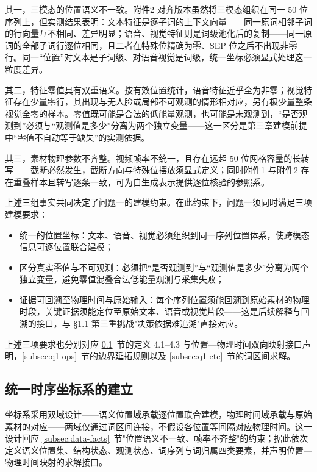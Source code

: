 \documentclass[colorprint,nocoverzero]{gmcmthesis}
\begin{document}
其一，三模态的位置语义不一致。附件2 对齐版本虽然将三模态组织在同一 50 位序列上，但实测结果表明：文本特征是逐子词的上下文向量——同一原词相邻子词的行向量互不相同、差异明显；语音、视觉特征则是词级池化后的复制——同一原词的全部子词行逐位相同，且二者在特殊位精确为零、SEP 位之后不出现非零行。同一``位置''对文本是子词级、对语音视觉是词级，统一坐标必须显式处理这一粒度差异。

其二，特征零值具有双重语义。按有效位置统计，语音特征近乎全为非零；视觉特征存在少量零行，其出现与无人脸或局部不可观测的情形相对应，另有极少量整条视觉全零的样本。零值既可能是合法的低能量观测，也可能是未观测到，``是否观测到''必须与``观测值是多少''分离为两个独立变量——这一区分是第三章建模前提中``零值不自动等于缺失''的实测依据。

其三，素材物理参数不齐整。视频帧率不统一，且存在远超 50 位网格容量的长转写——截断必然发生，截断方向与特殊位摆放须显式定义；同时附件1 与附件2 存在重叠样本且转写逐条一致，可为自生成表示提供逐位核验的参照系。

上述三组事实共同决定了问题一的建模约束。在此约束下，问题一须同时满足三项建模要求：

\begin{itemize}
  \item 统一的位置坐标：文本、语音、视觉必须组织到同一序列位置体系，使跨模态信息可逐位置联合建模；
  \item 区分真实零值与不可观测：必须把``是否观测到''与``观测值是多少''分离为两个独立变量，避免零值混叠合法低能量观测与采集失败；
  \item 证据可回溯至物理时间与原始输入：每个序列位置须能回溯到原始素材的物理时段，关键证据须能定位至原始文本、语音或视觉片段——这是后续解释与回溯的接口，与 §1.1 第三重挑战"决策依据难追溯"直接对应。
\end{itemize}

上述三项要求也分别对应 \ref{subsec:q1-coords}~节的定义 4.1--4.3 与位置—物理时间双向映射接口声明，\ref{subsec:q1-ops}~节的边界延拓规则以及 \ref{subsec:q1-ctc}~节的词区间求解。

\subsection{统一时序坐标系的建立}\label{subsec:q1-coords}
坐标系采用双域设计——语义位置域承载逐位置联合建模，物理时间域承载与原始素材的对应——两域仅通过词区间连接，不假设各位置等间隔对应物理时间。这一设计回应 \ref{subsec:data-facts}~节"位置语义不一致、帧率不齐整"的约束；据此依次定义语义位置集、结构状态、观测状态、词序列与词归属四类要素，并声明位置—物理时间映射的求解接口。
\end{document}
